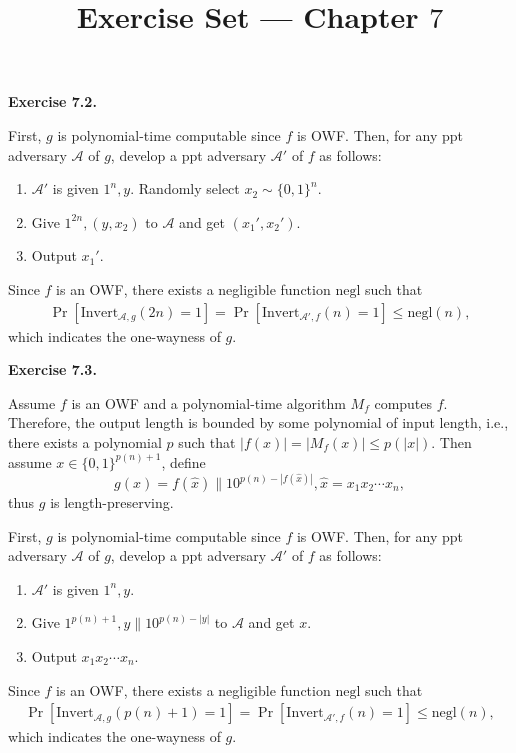 \documentclass[a4paper]{article}
\title{Exercise Set --- Chapter $7$}
\date{}
\newenvironment{exercise}[1]{
	\par
	\noindent\textbf{Exercise #1.}\quad
}{
	\par
	\bigskip
}
\newcommand{\sbra}[1]{\left[ #1 \right]}
\newcommand{\bin}{\{0,1\}}
\newcommand{\Invert}{\mathrm{Invert}}
\newcommand{\negl}{\mathrm{negl}}
\newcommand{\ppt}{{\sc ppt} }
\newcommand{\Acal}{\mathcal{A}}
\begin{document}
\maketitle

\begin{exercise}{7.2}
    First, $g$ is polynomial-time computable since $f$ is OWF.
    Then, for any \ppt adversary $\Acal$ of $g$, develop a \ppt adversary $\Acal'$ of $f$ as follows:
    \begin{enumerate}
        \item $\Acal'$ is given $1^n,y$. Randomly select $x_2\sim\bin^n$.
        \item Give $1^{2n},(y,x_2)$ to $\Acal$ and get $(x_1',x_2')$.
        \item Output $x_1'$.
    \end{enumerate}
    Since $f$ is an OWF, there exists a negligible function $\negl$ such that
    \begin{align*}
        \Pr\sbra{\Invert_{\Acal,g}(2n)=1}=\Pr\sbra{\Invert_{\Acal',f}(n)=1}\leq\negl(n),
    \end{align*}
    which indicates the one-wayness of $g$.
\end{exercise}

\begin{exercise}{7.3}
    Assume $f$ is an OWF and a polynomial-time algorithm $M_f$ computes $f$.
    Therefore, the output length is bounded by some polynomial of input length,
    i.e., there exists a polynomial $p$ such that $|f(x)|=|M_f(x)|\leq p(|x|)$.
    Then assume $x\in\bin^{p(n)+1}$, define
    $$
    g(x)=f(\hat x)\|10^{p(n)-|f(\hat x)|}, \hat x=x_1x_2\cdots x_n,
    $$
    thus $g$ is length-preserving.

    First, $g$ is polynomial-time computable since $f$ is OWF.
    Then, for any \ppt adversary $\Acal$ of $g$, develop a \ppt adversary $\Acal'$ of $f$ as follows:
    \begin{enumerate}
        \item $\Acal'$ is given $1^n,y$. 
        \item Give $1^{p(n)+1},y\|10^{p(n)-|y|}$ to $\Acal$ and get $x$.
        \item Output $x_1x_2\cdots x_n$.
    \end{enumerate}
    Since $f$ is an OWF, there exists a negligible function $\negl$ such that
    \begin{align*}
        \Pr\sbra{\Invert_{\Acal,g}(p(n)+1)=1}=
        \Pr\sbra{\Invert_{\Acal',f}(n)=1}\leq\negl(n),
    \end{align*}
    which indicates the one-wayness of $g$.
\end{exercise}
\end{document}
